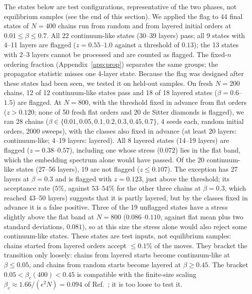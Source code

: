 \documentclass[prd,twocolumn,superscriptaddress,nofootinbib,amsmath,amssymb,floatfix]{revtex4-2}
\begin{document}
The states below are test configurations, representative of the two phases, not equilibrium samples (see the end of this section). We applied the flag to 44 final states of $N=400$ chains run from random and from layered initial orders at $0.01\leq\beta\leq0.7$. All 22 continuum-like states (30--39 layers) pass; all 9 states with 4--11 layers are flagged ($z=0.55$--$1.0$ against a threshold of $0.13$); the 13 states with 2--3 layers cannot be processed and are counted as flagged. The fixed-$n$ ordering fraction (Appendix~\ref{app:prop}) separates the same groups; the propagator statistic misses one 4-layer state. Because the flag was designed after these states had been seen, we tested it on held-out samples. On fresh $N=200$ chains, 12 of 12 continuum-like states pass and 18 of 18 layered states ($\beta=0.6$--$1.5$) are flagged. At $N=800$, with the threshold fixed in advance from flat orders ($z>0.120$; none of 50 fresh flat orders and 20 de Sitter diamonds is flagged), we ran 28 chains ($\beta\in\{0.01,0.05,0.1,0.2,0.3,0.45,0.7\}$, 4 seeds each, random initial orders, 2000 sweeps), with the classes also fixed in advance (at least 20 layers: continuum-like; 4--19 layers: layered). All 8 layered states (14--19 layers) are flagged ($z=0.38$--$0.57$), including one whose stress ($0.072$) lies in the flat band, which the embedding spectrum alone would have passed. Of the 20 continuum-like states (27--56 layers), 19 are not flagged ($z\leq0.107$). The exception has 27 layers at $\beta=0.3$ and is flagged with $z=0.123$, just above the threshold; its acceptance rate ($5\%$, against $53$--$54\%$ for the other three chains at $\beta=0.3$, which reached 43--50 layers) suggests that it is partly layered, but by the classes fixed in advance it is a false positive. Three of the 19 unflagged states have a stress slightly above the flat band at $N=800$ ($0.086$--$0.110$, against flat mean plus two standard deviations, $0.081$), so at this size the stress alone would also reject some continuum-like states. These states are test inputs, not equilibrium samples: chains started from layered orders accept $\leq0.1\%$ of the moves. They bracket the transition only loosely: chains from layered starts become continuum-like at $\beta\leq0.05$, and chains from random starts become layered at $\beta\geq0.45$. The bracket $0.05<\beta_c(400)<0.45$ is compatible with the finite-size scaling $\beta_c\approx1.66/(\epsilon^2N)=0.094$ of Ref.~\cite{GOS18}; it is too loose to test it.
\end{document}
